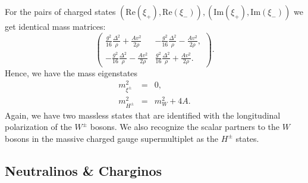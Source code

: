 For the pairs of charged states $(\text{Re}(\xi_+),\text{Re}(\xi_-)),(\text{Im}(\xi_+),\text{Im}(\xi_-))$ we get identical mass matrices: 
\begin{equation}
\begin{pmatrix} \frac{g^2}{16}\frac{\Delta^2}{\rho}+\frac{Av^2}{2\rho}  &  -\frac{g^2}{16}\frac{\Delta^2}{\rho}-\frac{Av^2}{2\rho},\\
-\frac{g^2}{16}\frac{\Delta^2}{\rho}-\frac{Av^2}{2\rho} & \frac{g^2}{16}\frac{\Delta^2}{\rho}+\frac{Av^2}{2\rho}.
\end{pmatrix}.
\end{equation}
Hence, we have the mass eigenstates
\begin{eqnarray}
m^2_{\xi^{\pm}}&=&0, \\
m^2_{H^{\pm}}&=&m^2_W + 4A.
\end{eqnarray}
Again, we have two massless states that are identified with the longitudinal polarization of the $W^{\pm}$ bosons. We also recognize the scalar partners to the $W$ bosons in the massive charged gauge supermultiplet as the $H^{\pm}$ states.

\subsection{Neutralinos \& Charginos}

